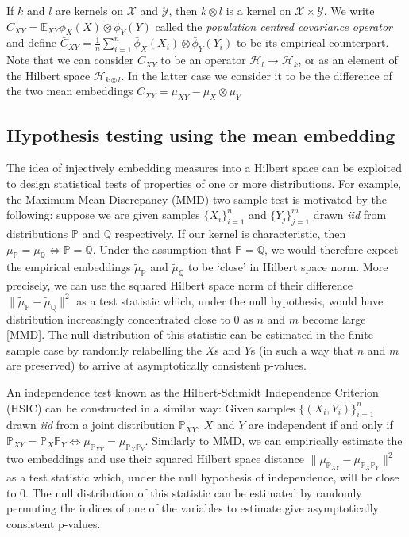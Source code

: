 \documentclass[]{article}
\begin{document}
If $k$ and $l$ are kernels on $\mathcal{X}$ and $\mathcal{Y}$, then $k\otimes l$ is a kernel on $\mathcal{X}\times \mathcal{Y}$. We write $C_{XY} = \mathbb{E}_{XY}\bar{\phi}_X(X)\otimes\bar{\phi}_Y(Y)$ called the \emph{population centred covariance operator} and define $\bar{C}_{XY} = \frac{1}{n}\sum_{i=1}^n\bar{\phi}_X(X_i)\otimes\bar{\phi}_Y(Y_i)$ to be its empirical counterpart. Note that we can consider $C_{XY}$ to be an operator $\mathcal{H}_l \longrightarrow \mathcal{H}_k$, or as an element of the Hilbert space $\mathcal{H}_{k\otimes l}$. In the latter case we consider it to be the difference of the two mean embeddings $C_{XY}=\mu_{XY} - \mu_{X}\otimes\mu_{Y}$

\subsection{Hypothesis testing using the mean embedding}

The idea of injectively embedding measures into a Hilbert space can be exploited to design statistical tests of properties of one or more distributions. For example, the Maximum Mean Discrepancy (MMD) two-sample test is motivated by the following: suppose we are given samples $\{X_i\}_{i=1}^n$ and $\{Y_j\}_{j=1}^m$ drawn \emph{iid} from distributions $\mathbb{P}$ and $\mathbb{Q}$ respectively. If our kernel is characteristic, then $\mu_\mathbb{P} = \mu_\mathbb{Q} \iff \mathbb{P} = \mathbb{Q}$. Under the assumption that $\mathbb{P} = \mathbb{Q}$, we would therefore expect the empirical embeddings $\tilde{\mu}_\mathbb{P}$ and $\tilde{\mu}_\mathbb{Q}$ to be `close' in Hilbert space norm. More precisely, we can use the squared Hilbert space norm of their difference $\|\tilde{\mu}_\mathbb{P} - \tilde{\mu}_\mathbb{Q} \|^2$ as a test statistic which, under the null hypothesis, would have distribution increasingly concentrated close to 0 as $n$ and $m$ become large [MMD]. The null distribution of this statistic can be estimated in the finite sample case by randomly relabelling the $X$s and $Y$s (in such a way that $n$ and $m$ are preserved) to arrive at asymptotically consistent p-values.

An independence test known as the Hilbert-Schmidt Independence Criterion (HSIC) can be constructed in a similar way: Given samples $\{(X_i,Y_i)\}_{i=1}^n$ drawn \emph{iid} from a joint distribution $\mathbb{P}_{XY}$, $X$ and $Y$ are independent if and only if $\mathbb{P}_{XY} = \mathbb{P}_X \mathbb{P}_Y \iff \mu_{\mathbb{P}_{XY}} = \mu_{\mathbb{P}_X\mathbb{P}_Y}$. Similarly to MMD, we can empirically estimate the two embeddings and use their squared Hilbert space distance  $\| \mu_{\mathbb{P}_{XY}} - \mu_{\mathbb{P}_X\mathbb{P}_Y}\|^2$ as a test statistic which, under the null hypothesis of independence, will be close to 0. The null distribution of this statistic can be estimated by randomly permuting the indices of one of the variables to estimate give asymptotically consistent p-values.
\end{document}
